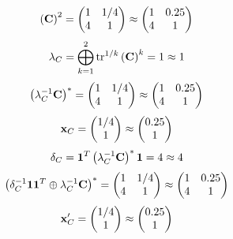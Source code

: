 \documentclass[10pt,a4paper]{article}
\begin{document}
	\[
		\left(\bold{C}\right)^{2} = 
		\begin{pmatrix}
			{1}{} & {1} / {{4}} \\
			{{4}}{} & {1}{} \\
		\end{pmatrix}
		\approx
		\begin{pmatrix}
			1        & 0.25     \\
			4        & 1        \\
		\end{pmatrix}
	\]
	\[
		\lambda_{C} =  \bigoplus ^{2} _{k = 1} \operatorname{tr} ^{1 / k} \left( \bold{C} \right)^k = {1}{}\approx 1
	\]
	\[
		\left(\lambda_{C}^{-1}\bold{C}\right)^* = 
		\begin{pmatrix}
			{1}{} & {1} / {{4}} \\
			{{4}}{} & {1}{} \\
		\end{pmatrix}
		\approx
		\begin{pmatrix}
			1        & 0.25     \\
			4        & 1        \\
		\end{pmatrix}
	\]
	\[
		\bold{x}_{C} = 
		\begin{pmatrix}
			{1} / {{4}} \\
			{1}{} \\
		\end{pmatrix}
		\approx
		\begin{pmatrix}
			0.25     \\
			1        \\
		\end{pmatrix}
	\]
	\[
		\delta_{C} = \bold{1}^T \left(\lambda_{C}^{-1}\bold{C}\right)^* \bold{1} = {{4}}{}\approx 4
	\]
	\[
		\left(\delta_{C}^{-1}\bold{11}^T \oplus \lambda_{C}^{-1}\bold{C}\right)^* = 
		\begin{pmatrix}
			{1}{} & {1} / {{4}} \\
			{{4}}{} & {1}{} \\
		\end{pmatrix}
		\approx
		\begin{pmatrix}
			1        & 0.25     \\
			4        & 1        \\
		\end{pmatrix}
	\]
	\[
		\bold{x}'_{C} = 
		\begin{pmatrix}
			{1} / {{4}} \\
			{1}{} \\
		\end{pmatrix}
		\approx
		\begin{pmatrix}
			0.25     \\
			1        \\
		\end{pmatrix}
	\]
\end{document}
